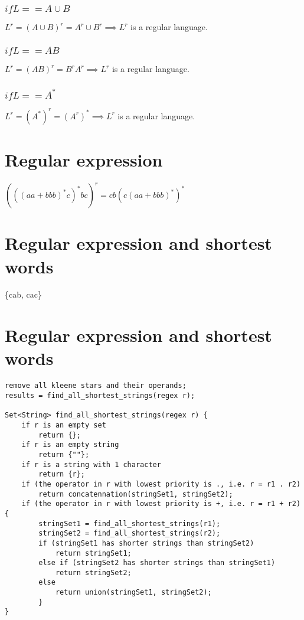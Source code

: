 \documentclass{article}
\begin{document}
\subsubsection{$if L == A \cup B$}
$L^r = (A \cup B)^r = A^r \cup B^r \implies L^r$ is a regular language.

\subsubsection{$if L == A B$}
$L^r = (A B)^r = B^r A^r \implies L^r$ is a regular language.

\subsubsection{$if L == A^*$}
$L^r = (A^*)^r = (A^r)^* \implies L^r$ is a regular language.

\section{Regular expression}
$(((aa + bbb)^*c)^*bc)^r = cb(c(aa + bbb)^*)^*$

\section{Regular expression and shortest words}
\{cab, cac\}

\section{Regular expression and shortest words}
\begin{lstlisting}
remove all kleene stars and their operands;
results = find_all_shortest_strings(regex r);

Set<String> find_all_shortest_strings(regex r) {
	if r is an empty set
		return {};
	if r is an empty string
		return {""};
	if r is a string with 1 character
		return {r};
	if (the operator in r with lowest priority is ., i.e. r = r1 . r2)
		return concatennation(stringSet1, stringSet2);
	if (the operator in r with lowest priority is +, i.e. r = r1 + r2) {
		stringSet1 = find_all_shortest_strings(r1);
		stringSet2 = find_all_shortest_strings(r2);
		if (stringSet1 has shorter strings than stringSet2)
			return stringSet1;
		else if (stringSet2 has shorter strings than stringSet1)
			return stringSet2;
		else
			return union(stringSet1, stringSet2);
		}
}
\end{lstlisting}
\end{document}

